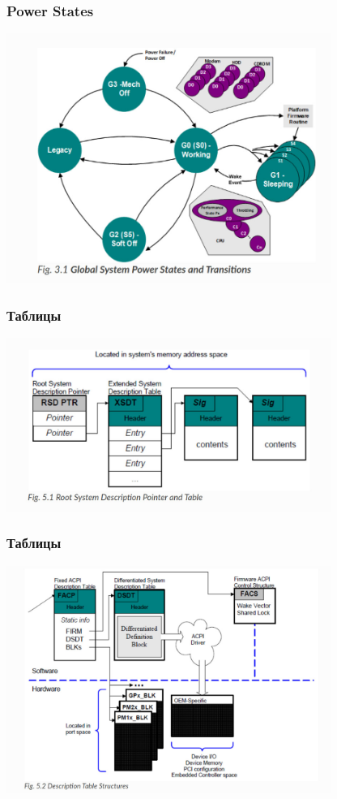 \documentclass{beamer}
\begin{document}
\begin{frame}
	\frametitle{Power States}
	\hspace{18pt}
	\includegraphics[width=300pt]{pictures/arch_acpi2.jpg}
\end{frame}

\begin{frame}
	\frametitle{Таблицы}
	\hspace{18pt}
	\includegraphics[width=300pt]{pictures/arch3.jpg}
\end{frame}

\begin{frame}
	\frametitle{Таблицы}
	\hspace{18pt}
	\includegraphics[width=300pt]{pictures/arch4.jpg}
\end{frame}
\end{document}
